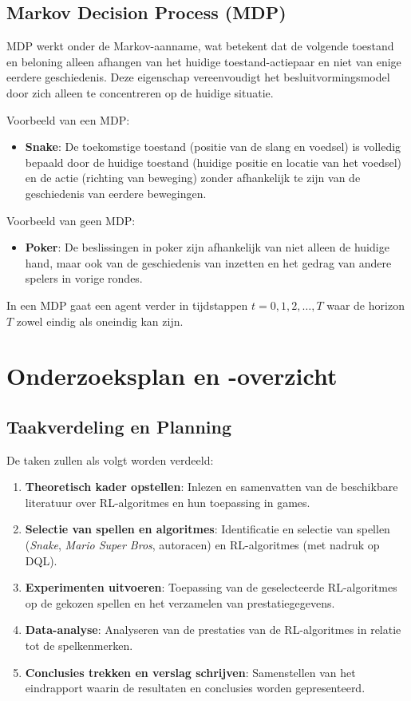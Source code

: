 \documentclass[a4paper,12pt]{article}
\begin{document}
\subsection{Markov Decision Process (MDP)}

MDP werkt onder de Markov-aanname, wat betekent dat de volgende toestand en
beloning alleen afhangen van het huidige toestand-actiepaar en niet van enige
eerdere geschiedenis. Deze eigenschap vereenvoudigt het besluitvormingsmodel
door zich alleen te concentreren op de huidige situatie.

Voorbeeld van een MDP:
\begin{itemize}
    \item \textbf{Snake}: De toekomstige toestand (positie van de slang en voedsel) is volledig bepaald door de huidige toestand (huidige positie en locatie van het voedsel) en de actie (richting van beweging) zonder afhankelijk te zijn van de geschiedenis van eerdere bewegingen.
\end{itemize}

Voorbeeld van geen MDP:
\begin{itemize}
    \item \textbf{Poker}: De beslissingen in poker zijn afhankelijk van niet alleen de huidige hand, maar ook van de geschiedenis van inzetten en het gedrag van andere spelers in vorige rondes.
\end{itemize}

In een MDP gaat een agent verder in tijdstappen \(t = 0, 1, 2, \ldots, T\) waar
de horizon \(T\) zowel eindig als oneindig kan zijn.

\section{Onderzoeksplan en -overzicht}

\subsection{Taakverdeling en Planning}
De taken zullen als volgt worden verdeeld:
\begin{enumerate}
    \item \textbf{Theoretisch kader opstellen}: Inlezen en samenvatten van de beschikbare literatuur over RL-algoritmes en hun toepassing in games.
    \item \textbf{Selectie van spellen en algoritmes}: Identificatie en selectie van spellen (\textit{Snake}, \textit{Mario Super Bros}, autoracen) en RL-algoritmes (met nadruk op DQL).
    \item \textbf{Experimenten uitvoeren}: Toepassing van de geselecteerde RL-algoritmes op de gekozen spellen en het verzamelen van prestatiegegevens.
    \item \textbf{Data-analyse}: Analyseren van de prestaties van de RL-algoritmes in relatie tot de spelkenmerken.
    \item \textbf{Conclusies trekken en verslag schrijven}: Samenstellen van het eindrapport waarin de resultaten en conclusies worden gepresenteerd.
\end{enumerate}
\end{document}
